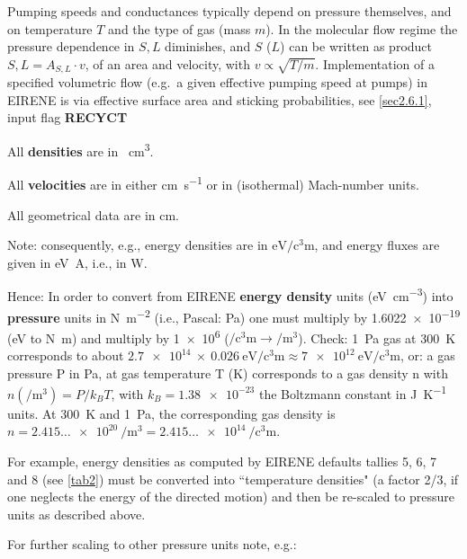 Pumping speeds and conductances typically depend on pressure themselves, and on
temperature $T$ and the type of gas (mass $m$).
In the molecular flow regime the pressure dependence in $S, L$ diminishes, and
$S$ ($L$) can be written as product $S,L =A_{S,L} \cdot v$, of an area and
velocity, with $v \propto \sqrt{T/m}$.
Implementation of a specified volumetric flow (e.g.\ a given effective pumping
speed at pumps) in EIRENE is via effective surface area and  sticking
probabilities, see \cref{sec2.6.1}, input flag \textbf{RECYCT}

All \textbf{densities} are in \si{\per\cubic\centi\metre}.

All \textbf{velocities} are in either \si{\centi\metre\per\second} or in
(isothermal) Mach-number units.

All geometrical data are in \si{\centi\metre}.

Note: consequently, e.g., energy densities are in
$\si{\electronvolt\per\cubic\centi\metre}$, and energy fluxes are given in
\si{\electronvolt\ampere}, i.e., in \si{\watt}.

Hence: In order to convert from EIRENE \textbf{energy density} units
(\si{\electronvolt\per\cubic\centi\metre}) into  \textbf{pressure} units in
\si{\newton\per\square\metre} (i.e., Pascal: \si{\pascal}) one must multiply by
\num{1.6022e-19} (\si{\electronvolt} to \si{\newton\metre}) and multiply by
\num{1e6} ($\si{\per\cubic\centi\metre} \rightarrow \si{\per\cubic\metre}$).
Check: \SI{1}{\pascal} gas at \SI{300}{\kelvin} corresponds to about
$\num{2.7e14} \ \times \ \SI{0.026}{\electronvolt\per\cubic\centi\metre}
  \approx \SI{7e12}{\electronvolt\per\cubic\centi\metre}$, or:
a gas pressure P in \si{\pascal}, at gas temperature T (\si{\kelvin})
corresponds to a gas density n with $n (\si{\per\cubic\metre}) = P/k_B T$,
with $k_B = \num{1.38e-23}
$ the Boltzmann constant in \si{\joule\per\kelvin} units.
At \SI{300}{\kelvin} and \SI{1}{\pascal}, the corresponding gas density is
$n=\num{2.415} \dots \SI {e20}{\per\cubic\metre} = \num{2.415} \dots \SI{e14}{\per\cubic\centi\metre}$.

For example, energy densities as computed by EIRENE defaults tallies 5, 6, 7
and 8 (see \cref{tab2}) must be converted into ``temperature densities" (a
factor 2/3, if one neglects the energy of the directed motion) and then be
re-scaled to pressure units as described above.

For further scaling to other pressure units note, e.g.:

